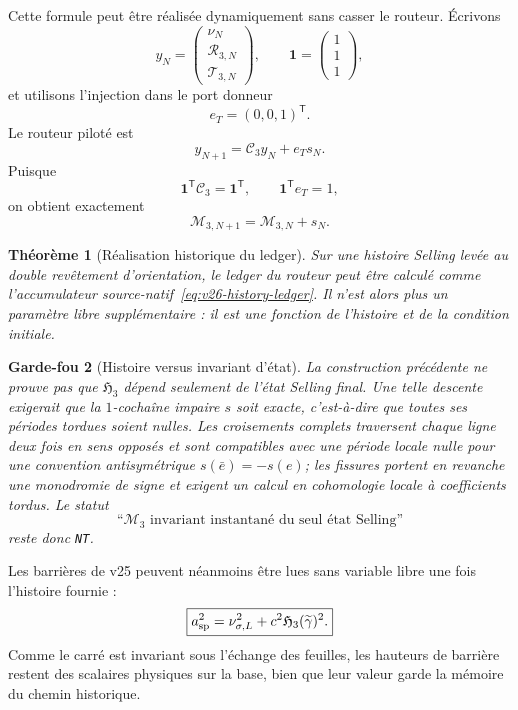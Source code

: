\documentclass[11pt,a4paper]{article}
\newtheorem{theorem}{Théorème}[section]
\newtheorem{guardrail}[theorem]{Garde-fou}
\newcommand{\certNT}{\texttt{NT}}
\begin{document}
Cette formule peut être réalisée dynamiquement sans casser le routeur. Écrivons
\[
 y_N=
 \begin{pmatrix}
 \nu_N\\ \mathscr R_{3,N}\\ \mathscr T_{3,N}
 \end{pmatrix},
 \qquad
 \mathbf1=
 \begin{pmatrix}1\\1\\1\end{pmatrix},
\]
et utilisons l'injection dans le port donneur
\[
 e_T=(0,0,1)^{\mathsf T}.
\]
Le routeur piloté est
\begin{equation}\label{eq:v26-driven-router}
 \boxed{
 y_{N+1}
 =
 \mathcal C_3y_N
 +
 e_Ts_N.}
\end{equation}
Puisque
\[
 \mathbf1^{\mathsf T}\mathcal C_3=\mathbf1^{\mathsf T},
 \qquad
 \mathbf1^{\mathsf T}e_T=1,
\]
on obtient exactement
\begin{equation}\label{eq:v26-ledger-update}
 \boxed{
 \mathcal M_{3,N+1}
 =
 \mathcal M_{3,N}+s_N.}
\end{equation}

\begin{theorem}[Réalisation historique du ledger]\label{thm:v26-history-realization}
Sur une histoire Selling \emph{levée} au double revêtement d'orientation, le ledger du routeur peut être calculé comme l'accumulateur source-natif~\eqref{eq:v26-history-ledger}. Il n'est alors plus un paramètre libre supplémentaire : il est une fonction de l'histoire et de la condition initiale.
\end{theorem}

\begin{guardrail}[Histoire versus invariant d'état]
La construction précédente ne prouve pas que $\mathfrak H_3$ dépend seulement de l'état Selling final. Une telle descente exigerait que la $1$-cochaîne impaire $s$ soit exacte, c'est-à-dire que toutes ses périodes tordues soient nulles. Les croisements complets traversent chaque ligne deux fois en sens opposés et sont compatibles avec une période locale nulle pour une convention antisymétrique $s(\bar e)=-s(e)$; les fissures portent en revanche une monodromie de signe et exigent un calcul en cohomologie locale à coefficients tordus. Le statut
\[
 \text{``$\mathcal M_3$ invariant instantané du seul état Selling''}
\]
reste donc \certNT{}.
\end{guardrail}

Les barrières de v25 peuvent néanmoins être lues sans variable libre une fois l'histoire fournie :
\begin{equation}\label{eq:v26-history-barrier-control}
 \boxed{
 a_{\rm sp}^2
 =
 \nu_{\sigma,L}^2
 +
 c^2\mathfrak H_3(\widetilde\gamma)^2.}
\end{equation}
Comme le carré est invariant sous l'échange des feuilles, les hauteurs de barrière restent des scalaires physiques sur la base, bien que leur valeur garde la mémoire du chemin historique.
\end{document}
